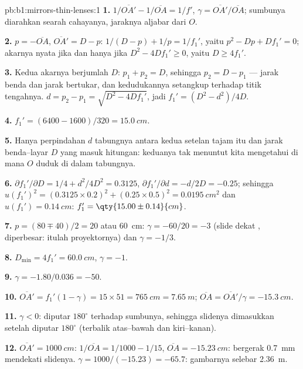 \begin{solution}{pb:b1:mirrors-thin-lenses:1}
\textbf{1.} $1/\overline{OA'} - 1/\overline{OA} = 1/f'$,
$\gamma = \overline{OA'}/\overline{OA}$; sumbunya diarahkan searah
cahayanya, jaraknya aljabar dari $O$.

\textbf{2.} $p = -\overline{OA}$, $\overline{OA'} = D - p$:
$1/(D - p) + 1/p = 1/f_1'$, yaitu $p^2 - Dp + Df_1' = 0$; akarnya nyata jika dan hanya jika
$D^2 - 4Df_1' \geq 0$, yaitu $D \geq 4f_1'$.

\textbf{3.} Kedua akarnya berjumlah $D$: $p_1 + p_2 = D$, sehingga $p_2 = D - p_1$ ---
jarak benda dan jarak  bertukar, dan kedudukannya setangkup
terhadap titik tengahnya. $d = p_2 - p_1 = \sqrt{D^2 - 4Df_1'}$, jadi $f_1' = (D^2 -
d^2)/4D$.

\textbf{4.} $f_1' = (6400 - 1600)/320 = \qty{15.0}{cm}$.

\textbf{5.} Hanya perpindahan $d$ tabungnya antara kedua setelan tajam
itu dan jarak benda--layar $D$ yang masuk hitungan: keduanya tak
menuntut kita mengetahui di mana $O$ duduk di dalam tabungnya.

\textbf{6.} $\partial f_1'/\partial D = 1/4 + d^2/4D^2 = 0.3125$,
$\partial f_1'/\partial d = -d/2D = -0.25$; sehingga
$u(f_1')^2 = (0.3125 \times 0.2)^2 + (0.25 \times 0.5)^2 =
\qty{0.0195}{cm^2}$ dan $u(f_1') = \qty{0.14}{cm}$:
$f_1' = \qty{15.00\pm0.14}{cm}$.

\textbf{7.} $p = (80 \mp 40)/2 = 20$ atau \qty{60}{cm}: $\gamma =
-60/20 = -3$ (slide dekat , diperbesar: itulah proyektornya) dan
$\gamma = -1/3$.

\textbf{8.} $D_{\min} = 4f_1' = \qty{60.0}{cm}$, $\gamma = -1$.

\textbf{9.} $\gamma = -1.80/0.036 = -50$.

\textbf{10.} $\overline{OA'} = f_1'(1 - \gamma) = 15 \times 51 =
\qty{765}{cm} = \qty{7.65}{m}$; $\overline{OA} = \overline{OA'}/\gamma =
\qty{-15.3}{cm}$.

\textbf{11.} $\gamma < 0$:  diputar $180^\circ$
terhadap sumbunya, sehingga slidenya dimasukkan setelah diputar
$180^\circ$ (terbalik atas--bawah dan kiri--kanan).

\textbf{12.} $\overline{OA'} = \qty{1000}{cm}$: $1/\overline{OA} = 1/1000
- 1/15$, $\overline{OA} = \qty{-15.23}{cm}$:  bergerak \qty{0.7}{mm}
mendekati slidenya. $\gamma = 1000/(-15.23) = -65.7$: gambarnya
selebar \qty{2.36}{m}.


\end{solution}
